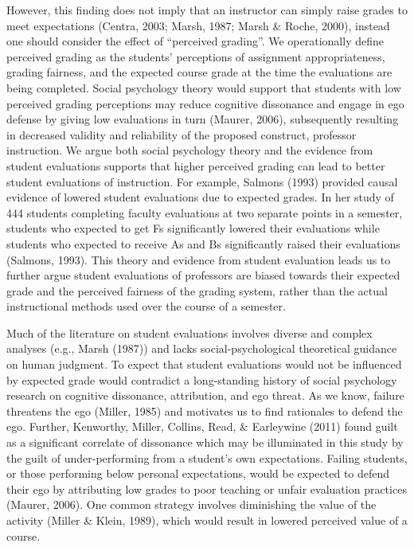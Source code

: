\documentclass[man]{apa6}
\theoremstyle{definition}
\theoremstyle{definition}
\theoremstyle{definition}
\theoremstyle{remark}
\begin{document}
However, this finding does not imply that an instructor can simply raise
grades to meet expectations (Centra, 2003; Marsh, 1987; Marsh \& Roche,
2000), instead one should consider the effect of \enquote{perceived
grading}. We operationally define perceived grading as the students'
perceptions of assignment appropriateness, grading fairness, and the
expected course grade at the time the evaluations are being completed.
Social psychology theory would support that students with low perceived
grading perceptions may reduce cognitive dissonance and engage in ego
defense by giving low evaluations in turn (Maurer, 2006), subsequently
resulting in decreased validity and reliability of the proposed
construct, professor instruction. We argue both social psychology theory
and the evidence from student evaluations supports that higher perceived
grading can lead to better student evaluations of instruction. For
example, Salmons (1993) provided causal evidence of lowered student
evaluations due to expected grades. In her study of 444 students
completing faculty evaluations at two separate points in a semester,
students who expected to get Fs significantly lowered their evaluations
while students who expected to receive As and Bs significantly raised
their evaluations (Salmons, 1993). This theory and evidence from student
evaluation leads us to further argue student evaluations of professors
are biased towards their expected grade and the perceived fairness of
the grading system, rather than the actual instructional methods used
over the course of a semester.

Much of the literature on student evaluations involves diverse and
complex analyses (e.g., Marsh (1987)) and lacks social-psychological
theoretical guidance on human judgment. To expect that student
evaluations would not be influenced by expected grade would contradict a
long-standing history of social psychology research on cognitive
dissonance, attribution, and ego threat. As we know, failure threatens
the ego (Miller, 1985) and motivates us to find rationales to defend the
ego. Further, Kenworthy, Miller, Collins, Read, \& Earleywine (2011)
found guilt as a significant correlate of dissonance which may be
illuminated in this study by the guilt of under-performing from a
student's own expectations. Failing students, or those performing below
personal expectations, would be expected to defend their ego by
attributing low grades to poor teaching or unfair evaluation practices
(Maurer, 2006). One common strategy involves diminishing the value of
the activity (Miller \& Klein, 1989), which would result in lowered
perceived value of a course.
\end{document}
